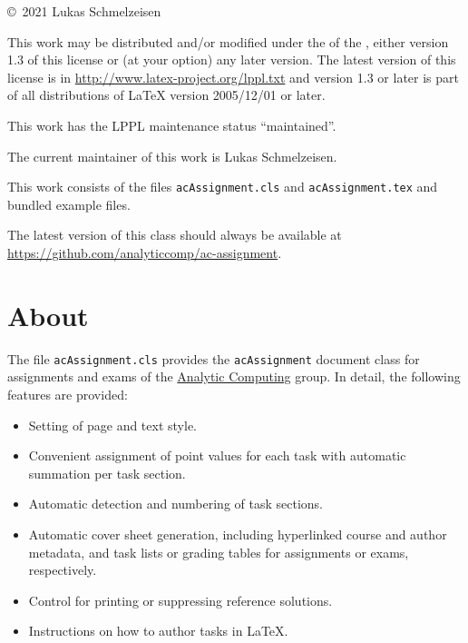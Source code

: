 \documentclass{acAssignment}
\begin{document}
\maketitle

\begin{multicols}{2}
    \tableofcontents
\end{multicols}

\vfill

\copyright~2021 Lukas Schmelzeisen

This work may be distributed and/or modified under the of the , either version 1.3 of this license or (at your option) any later version.
The latest version of this license is in \url{http://www.latex-project.org/lppl.txt} and version 1.3 or later is part of all distributions of LaTeX version 2005/12/01 or later.

This work has the LPPL maintenance status ``maintained''.

The current maintainer of this work is Lukas Schmelzeisen.

This work consists of the files \texttt{acAssignment.cls} and \texttt{acAssignment.tex} and bundled example files.

{\hfuzz=31pt
The latest version of this class should always be available at \url{https://github.com/analyticcomp/ac-assignment}.
\par}


\section{About}
\label{sec:about}

The file \texttt{acAssignment.cls} provides the \texttt{acAssignment} document class for assignments and exams of the \href{https://www.ipvs.uni-stuttgart.de/departments/ac/}{Analytic Computing} group.
In detail, the following features are provided:

\begin{itemize}
    \item Setting of page and text style.
    \item Convenient assignment of point values for each task with automatic summation per task section.
    \item Automatic detection and numbering of task sections.
    \item Automatic cover sheet generation, including hyperlinked course and author metadata, and task lists or grading tables for assignments or exams, respectively.
    \item Control for printing or suppressing reference solutions.
    \item Instructions on how to author tasks in \LaTeX.
\end{itemize}
\end{document}
